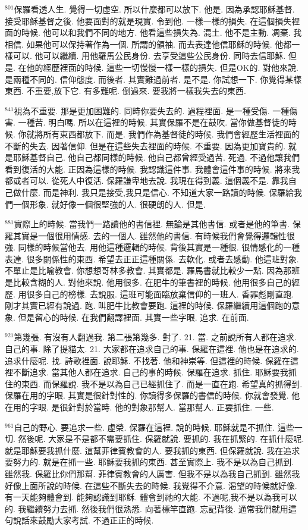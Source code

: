 \documentclass{book}
\begin{document}
$^{801}$保羅看透人生.
覺得一切虛空.
所以什麼都可以放下.
他是.
因為承認耶穌基督.
接受耶穌基督之後.
他要面對的就是現實.
令到他.
一樣一樣的損失.
在這個損失裡面的時候.
他可以和我們不同的地方.
他看這些損失為.
混土.
他不是主動.
凋棄.
我相信.
如果他可以保持著作為一個.
所謂的領袖.
而去表達他信耶穌的時候.
他都一樣可以.
他可以繼續.
用他羅馬公民身份.
去享受這些公民身份.
同時去信耶穌.
但是.
在他的經歷裡面的時候.
這些一切慢慢一樣一樣的損失.
但是OK的.
對他來說.
是兩種不同的.
信仰態度.
而後者.
其實難過前者.
是不是.
你試想一下.
你覺得某樣東西.
不重要,放下它.
有多難呢.
倒過來.
要我將一樣我失去的東西.

$^{841}$視為不重要.
那是更加困難的.
同時你要失去的.
過程裡面.
是一種受傷.
一種傷害.
一種苦.
明白嗎.
所以在這裡的時候.
其實保羅不是在鼓吹.
當你做基督徒的時候.
你就將所有東西都放下.
而是.
我們作為基督徒的時候.
我們會經歷生活裡面的不斷的失去.
因著信仰.
但是在這些失去裡面的時候.
不重要.
因為更加寶貴的.
就是耶穌基督自己.
他自己都同樣的時候.
他自己都曾經受過苦.
死過.
不過他讓我們看到復活的大能.
正因為這樣的時候.
我認識這件事.
我體會這件事的時候.
將來我都或者可以.
從死人中復活.
保羅謙卑地去說.
我現在得到義.
這個義不是.
靠我自己做什麼.
而是神利.
我只是接受,我只是信心.
不知道大家一路讀的時候.
保羅給我們一個形象.
就好像一個很堅強的人.
很硬朗的人.
但是.

$^{881}$實際上的時候.
當我們一路讀他的書信裡.
無論是其他書信.
或者是他的筆書.
保羅其實是一個很用情感.
去的一個人.
雖然他的書信.
有時候我們會覺得邏輯性很強.
同樣的時候當他去.
用他這種邏輯的時候.
背後其實是一種很.
很情感化的一種表達.
很多關係性的東西.
希望去正正這種關係.
去軟化.
或者去感動.
他這班對象.
不單止是比喻教會.
你想想哥林多教會.
其實都是.
羅馬書就比較少一點.
因為那班是比較含糊的人.
對他來說.
他用很多.
在肥牛的筆書裡的時候.
他用很多自己的經歷.
用很多自己的榜樣.
去說服.
這班可能面臨放棄信仰的一班人.
香罪彪剛直跑.
剛才其實已經有說過.
跑.
叫肥牛比教會要跑.
這裡的時候.
保羅繼續用這個跑的意象.
但是留心的時候.
在我們翻譯裡面.
其實一些字眼.
追求.
在前面.

$^{921}$第幾張.
有沒有人翻過我.
第二張第幾多.
對了.
21.
當.
之前說所有人都在追求.
自己的事.
除了提貓太.
21.
大家都在追求自己的事.
保羅在這裡.
他也是在追求的.
追求什麼呢.
找.
詩歌裡面.
說耶穌.
不找著.
他和神崇等.
但這裡的時候.
保羅在這裡不斷追求.
當其他人都在追求.
自己的事的時候.
保羅在追求.
抓住.
耶穌要我抓住的東西.
而保羅說.
我不是以為自己已經抓住了.
而是一直在跑.
希望真的抓得到.
保羅在用的字眼.
其實是很針對性的.
你讀得多保羅的書信的時候.
你就會發覺.
他在用的字眼.
是很針對於當時.
他的對象那幫人.
當那幫人.
正要抓住.
一些.

$^{961}$自己的野心.
要追求一些.
虛榮.
保羅在這裡.
說的時候.
耶穌就是不抓住.
這些一切.
然後呢.
大家是不是都不需要抓住.
保羅就說.
要抓的.
我在抓緊的.
在抓什麼呢.
就是耶穌要我抓什麼.
這幫菲律賓教會的人.
要我抓的東西.
但保羅就說.
我在追求要努力的.
就是在抓一些.
耶穌要我抓的東西.
甚至實際上.
我不是以為自己抓到.
雖然我.
保羅比你們那幫.
菲律賓教會的人厲害.
但我不是以為我自己抓到.
雖然我好像上面所說的時候.
在這些不斷失去的時候.
我覺得不介意.
渴望的時候就好像.
有一天能夠體會到.
能夠認識到耶穌.
體會到祂的大能.
不過呢,我不是以為我可以的.
我繼續努力去抓.
然後我們很熟悉.
向著標竿直跑.
忘記背後.
通常我們就用這句說話來鼓勵大家考試.
不過正正的時候.
\end{document}
